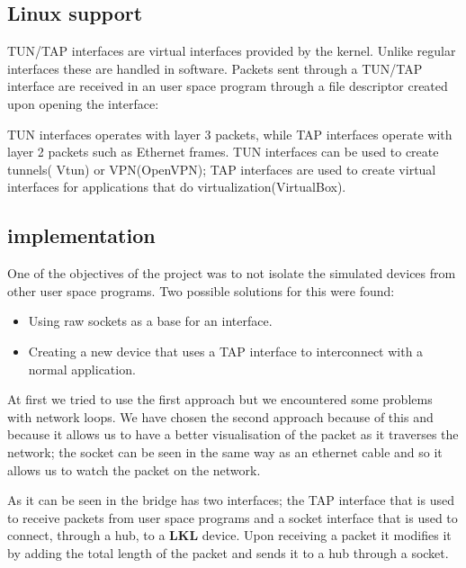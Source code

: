 \subsection{Linux support}
\label{sub-sec:bridge-lin}

TUN/TAP interfaces are virtual interfaces provided by the kernel. Unlike regular interfaces
these are handled in software. Packets sent through a TUN/TAP interface are received in
an user space program through a file descriptor created upon opening the interface: 

\lstset{language=C,caption=Opening a tun/tap interface,label=lst:tapopen}


TUN interfaces operates with layer 3 packets, while TAP interfaces operate with layer 
2 packets such as Ethernet frames. TUN interfaces can be used to create tunnels( Vtun)
or VPN(OpenVPN); TAP interfaces are used to create virtual interfaces for applications 
that do virtualization(VirtualBox).

\subsection{\text{\project} implementation}
\label{sub-sec:bridge-lkl}

One of the objectives of the project was to not isolate the simulated devices from other user space 
programs. Two possible solutions for this were found:
\begin{itemize}
  \item Using raw sockets as a base for an interface.
  \item Creating a new device that uses a TAP interface to interconnect with a normal application.
\end{itemize}

At first we tried to use the first approach but we encountered some problems with network loops.
We have chosen the second approach because of this and because it allows us to have a better visualisation of the packet
as it traverses the network; the socket can be seen in the same way as an ethernet cable and so it allows
us to watch the packet on the network.


As it can be seen in  the bridge has two interfaces; the TAP interface that is used to 
receive packets from user space programs and a socket interface that is used to connect, through a hub, to 
a \textbf{LKL} device. Upon receiving a packet it modifies it by adding the total length of the packet and sends it to a hub 
through a socket.


